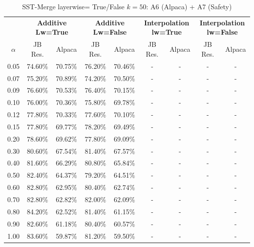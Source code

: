 \begin{table}[h]
\centering
\caption{SST-Merge layerwise= True/False $k=50$: A6 (Alpaca) + A7 (Safety)}
\label{tab:res_a6_sst_50}
\begin{tabular}{c|cc|cc|cc|cc}
\hline
 & \multicolumn{2}{c|}{\textbf{Additive Lw=True}} & \multicolumn{2}{c|}{\textbf{Additive Lw=False}} & \multicolumn{2}{c|}{\textbf{Interpolation lw=True}}& \multicolumn{2}{c}{\textbf{Interpolation lw=False}} \\
$\alpha$ & JB Res. & Alpaca & JB Res. & Alpaca & JB Res. & Alpaca & JB Res. & Alpaca \\
\hline
0.05 & 74.60\% & 70.75\% & 76.20\% & 70.46\% & - & - & - & - \\
0.07 & 75.20\% & 70.89\% & 74.20\% & 70.50\% & - & - & - & - \\
0.09 & 76.60\% & 70.53\% & 76.40\% & 70.15\% & - & - & - & - \\
0.10 & 76.00\% & 70.36\% & 75.80\% & 69.78\% & - & - & - & - \\
0.12 & 77.80\% & 70.33\% & 77.60\% & 70.10\% & - & - & - & - \\
0.15 & 77.80\% & 69.77\% & 78.20\% & 69.49\% & - & - & - & - \\
0.20 & 78.60\% & 69.62\% & 77.80\% & 69.09\% & - & - & - & - \\
0.30 & 80.60\% & 67.54\% & 81.40\% & 67.57\% & - & - & - & - \\
0.40 & 81.60\% & 66.29\% & 80.80\% & 65.84\% & - & - & - & - \\
0.50 & 82.40\% & 64.37\% & 79.20\% & 64.51\% & - & - & - & - \\
0.60 & 82.80\% & 62.95\% & 80.40\% & 62.74\% & - & - & - & - \\
0.70 & 82.80\% & 62.82\% & 82.00\% & 62.09\% & - & - & - & - \\
0.80 & 84.20\% & 62.52\% & 81.40\% & 61.15\% & - & - & - & - \\
0.90 & 82.60\% & 61.18\% & 80.40\% & 60.57\% & - & - & - & - \\
1.00 & 83.60\% & 59.87\% & 81.20\% & 59.50\% & - & - & - & - \\
\hline
\end{tabular}
\end{table}
\FloatBarrier

